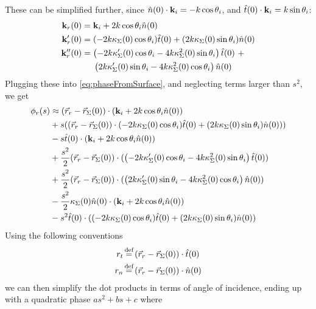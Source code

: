 \documentclass{article}
\begin{document}
These can be simplified further, since $\hat{n}(0) \cdot \mathbf{k}_i = -k
\cos \theta_i$, and $\hat{t}(0) \cdot \mathbf{k}_i = k \sin \theta_i$:
\begin{subequations}
\begin{align}
   \wavevec_r(0) &= \wavevec_i + 2 \dispRel \cos \theta_i \unitNorm(0) \\
   \wavevec_r'(0) &= (-2 \dispRel \curv_{\surf}(0) \cos \theta_i )
      \unitTang(0) + (2 \dispRel \curv_{\surf}(0) \sin \theta_i ) \unitNorm(0) \\
   \wavevec_r''(0) &= \left( - 2 \dispRel \curv_{\surf}'(0) \cos \theta_i -
      4 \dispRel \curv_{\surf}^2(0) \sin \theta_i \right) \unitTang(0) \ +
      \nonumber \\
   & \quad \ \left( 2 \dispRel \curv_{\surf}'(0) \sin \theta_i  - 4
      \dispRel \curv_{\surf}^2(0) \cos \theta_i \right) \unitNorm(0)
\end{align}
\end{subequations}
Plugging these into \eqref{eq:phaseFromSurface}, and neglecting terms larger than
$s^2$, we get
\begin{align}
   \phi_r(s) & \approx (\vec{r}_r - \vec{r}_{\Sigma}(0)) \cdot ( \mathbf{k}_i + 2 k \cos \theta_i \hat{n}(0) ) \nonumber \\
   &+ s \Large( ( \vec{r}_r - \vec{r}_{\Sigma}(0) ) \cdot (-2 k \kappa_{\Sigma}(0) \cos \theta_i ) \hat{t}(0) + (2 k \kappa_{\Sigma}(0) \sin \theta _i ) \hat{n}(0) ) ) \nonumber \\
   &- s \hat{t}(0) \cdot ( \mathbf{k}_i + 2 k \cos \theta_i \hat{n}(0) ) \nonumber \\
   &+ \frac{s^2}{2} ( \vec{r}_r - \vec{r}_{\Sigma}(0) ) \cdot ( \left( - 2 k \kappa_{\Sigma}'(0) \cos \theta_i - 4 k \kappa_{\Sigma}^2(0) \sin \theta_i \right) \hat{t}(0) ) \nonumber \\
   &+ \frac{s^2}{2} ( \vec{r}_r - \vec{r}_{\Sigma}(0) ) \cdot ( \left( 2 k \kappa_{\Sigma}'(0) \sin \theta_i - 4 k \kappa_{\Sigma}^2(0) \cos \theta_i \right) \hat{n}(0) ) \nonumber \\
   &- \frac{s^2}{2}  \kappa_{\Sigma}(0) \hat{n}(0) \cdot ( \mathbf{k}_i + 2 k \cos \theta_i \hat{n}(0) ) \\
   &- s^2 \hat{t}(0) \cdot( (-2 k \kappa_{\Sigma}(0) \cos \theta_i ) \hat{t}(0) + (2 k \kappa_{\Sigma}(0) \sin \theta _i ) \hat{n}(0) ) 
   \label{eq:reflectionPhase}
\end{align}
Using the following conventions 
\begin{subequations}
\begin{align}
   r_t & \defeq (\pos_r - \pos_{\Sigma}(0)) \cdot \unitTang(0) \\ 
   r_n & \defeq (\pos_r - \pos_{\Sigma}(0)) \cdot \unitNorm(0)
\end{align}
\end{subequations}
we can then simplify the dot products in terms of angle of incidence, ending up with
a quadratic phase $as^2 + bs + c$ where 
\end{document}
